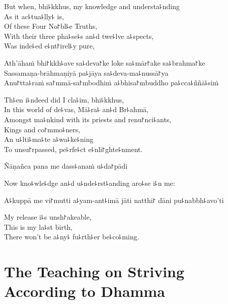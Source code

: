 \begin{english}
  But when, bhi꜕kkhus, my knowledge and understa꜕nding\\
  As it ac꜕tua꜕lly꜕ is,\\
  Of these Four No꜓bl꜕e Truths,\\
  With their three pha꜕se꜕s an꜕d twe꜕lve a꜕spects,\\
  Was inde꜕ed e꜕nt꜓irel꜕y pure,
\end{english}

Ath'āhaṁ bhi꜓kkh꜕ave sa꜕deva꜓ke loke sa꜕mār꜓ake sa꜕brahma꜓ke\\
Sassamaṇa-brāhmaṇiyā pa꜕jāya sa꜕deva-ma꜕nussā꜓ya\\
Anu꜓tta꜕raṁ sa꜓mmā-sa꜓mbodhiṁ a꜕bhisa꜓mbuddho pa꜕cca꜕ññā꜕siṁ

\begin{english}
  Th꜕en i꜕ndeed did I cla꜕im, bhi꜕kkhus,\\
  In this world of de꜕vas, Mā꜕ra꜕ an꜕d Br꜕ahmā,\\
  Amongst ma꜕nkind with its priests and renu꜓nci꜕ants,\\
  Kings and co꜓mmo꜕ners,\\
  An u꜕lti꜕ma꜕te a꜕wa꜕ke꜕ning\\
  To unsu꜓rpassed, pe꜕rfe꜕ct e꜕nli꜓ghte꜕nment.
\end{english}

Ñāṇañca pana me dass꜕anaṁ u꜕da꜓pādi

\begin{english}
  Now kno꜕wle꜕dge an꜕d u꜕nde꜕rst꜕anding aro꜕se i꜕n me:
\end{english}

\ifaivedition
\clearpage
\fi

A꜕kuppā me vi꜓mutti a꜕yam-ant꜕imā jāti natthi꜓ dāni pu꜕nabbh꜕avo'ti

\begin{english}
  My release i꜕s unsh꜓akeable,\\
  This is my la꜕st birth,\\
  There won't be a꜕ny꜕ fu꜕rth꜕er be꜕co꜕ming.
\end{english}

\chapter[Striving According to Dhamma]{The Teaching on Striving According to Dhamma}%


\begin{leader}
\end{leader}

